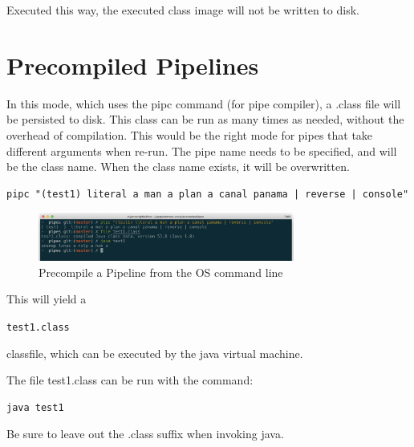 Executed this way, the executed class image will not be written to
disk.

\section{Precompiled Pipelines}
In this mode, which uses the pipc command (for pipe compiler), a .class file will be persisted to disk. This class can be run as many times as needed, without the overhead of compilation. This would be the right mode for pipes that take different arguments when re-run.
The pipe name needs to be specified, and will be the class name. When
the class name exists, it will be overwritten.
\begin{lstlisting}
pipc "(test1) literal a man a plan a canal panama | reverse | console"
\end{lstlisting}
\begin{figure}[h]
  \includegraphics[width=0.75\textwidth]{images/pipcfromshell.png}
  \caption{Precompile a Pipeline from the OS command line}
  \label{fig:pipcfromshell}
\end{figure}

This will yield a \begin{alltt}test1.class\end{alltt} classfile, which
can be executed by the java virtual machine.

The file test1.class can be run with the command:
\begin{verbatim}
java test1
\end{verbatim}
Be sure to leave out the .class suffix when invoking java.

